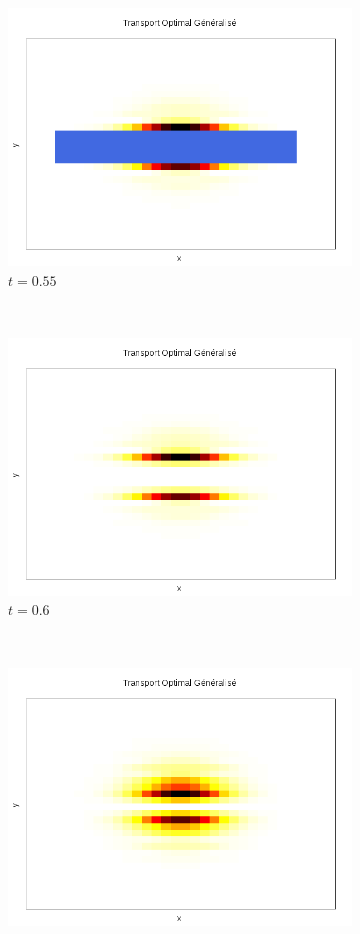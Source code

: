 \documentclass[a4paper,12pt]{article}
\begin{document}
\begin{figure}[!h]
\begin{subfigure}[b]{0.18\linewidth}
\includegraphics[width=\linewidth]{img/2DObstacle/T_00018.png}
\caption{$t=0.55$}
\end{subfigure}
~
\begin{subfigure}[b]{0.18\linewidth}
\includegraphics[width=\linewidth]{img/2DObstacle/T_00021.png}
\caption{$t=0.6$}
\end{subfigure}
~
\begin{subfigure}[b]{0.18\linewidth}
\includegraphics[width=\linewidth]{img/2DObstacle/T_00028.png}

\end{subfigure}
\end{figure}
\end{document}

